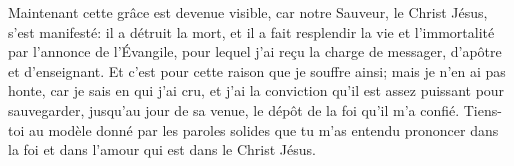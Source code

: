 Maintenant cette grâce est devenue visible,
	car notre Sauveur, le Christ Jésus, s’est manifesté:
	il a détruit la mort,
	et il a fait resplendir la vie et l’immortalité par l’annonce de l’Évangile,
	pour lequel j’ai reçu la charge de messager, d’apôtre et d’enseignant.
Et c’est pour cette raison que je souffre ainsi;
	mais je n’en ai pas honte, car je sais en qui j’ai cru,
	et j’ai la conviction qu’il est assez puissant pour sauvegarder,
		jusqu’au jour de sa venue,
	le dépôt de la foi qu’il m’a confié.
Tiens-toi au modèle donné par les paroles solides
		que tu m’as entendu prononcer dans la foi et dans l’amour
		qui est dans le Christ Jésus.

